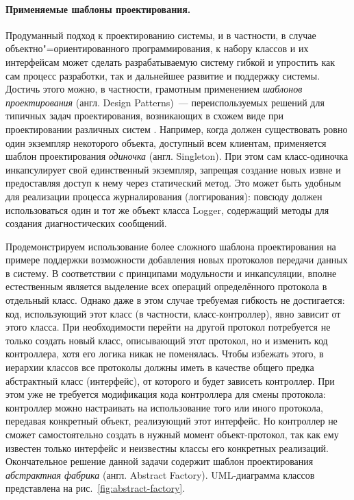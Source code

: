 \documentclass[a4paper, 14pt, titlepage]{extarticle}
\newcommand{\eng}[1]{\foreignlanguage{english}{#1}}
\newcommand{\term}[1]{\emph{#1}}
\begin{document}
  \paragraph{Применяемые шаблоны проектирования.}
  Продуманный подход к проектированию системы, и в частности, в случае объектно"=ориентированного
  программирования, к набору классов и их интерфейсам может сделать разрабатываемую систему гибкой и
  упростить как сам процесс разработки, так и дальнейшее развитие и поддержку системы. Достичь этого
  можно, в частности, грамотным применением \term{шаблонов проектирования} (англ. \eng{Design
  Patterns})~--- переиспользуемых решений для типичных задач проектирования, возникающих в схожем
  виде при проектировании различных систем \cite{gamma-patterns}. Например, когда должен
  существовать ровно один экземпляр некоторого объекта, доступный всем клиентам, применяется шаблон
  проектирования \term{одиночка} (англ. \eng{Singleton}). При этом сам класс-одиночка инкапсулирует
  свой единственный экземпляр, запрещая создание новых извне и предоставляя доступ к нему через
  статический метод. Это может быть удобным для реализации процесса журналирования (логгирования):
  повсюду должен использоваться один и тот же объект класса \eng{Logger}, содержащий методы для
  создания диагностических сообщений.

  Продемонстрируем использование более сложного шаблона проектирования на примере поддержки
  возможности добавления новых протоколов передачи данных в систему.
  В соответствии с принципами модульности и инкапсуляции, вполне естественным является выделение всех
  операций определённого протокола в отдельный класс. Однако даже в этом случае требуемая гибкость
  не достигается: код, использующий этот класс (в частности, класс-контроллер), явно зависит от
  этого класса. При необходимости перейти на другой протокол потребуется не только создать новый
  класс, описывающий этот протокол, но и изменить код контроллера, хотя его логика никак не
  поменялась. Чтобы избежать этого, в иерархии классов все протоколы должны иметь в качестве общего
  предка абстрактный класс (интерфейс), от которого и будет зависеть контроллер. При этом уже не
  требуется модификация кода контроллера для смены протокола: контроллер можно настраивать на
  использование того или иного протокола, передавая конкретный объект, реализующий этот интерфейс.
  Но контроллер не сможет самостоятельно создать в нужный момент объект-протокол, так как ему
  известен только интерфейс и неизвестны классы его конкретных реализаций.
  Окончательное решение данной задачи содержит шаблон проектирования \term{абстрактная фабрика}
  (англ. \eng{Abstract Factory}). UML-диаграмма классов представлена на рис.~\ref{fig:abstract-factory}.
\end{document}
